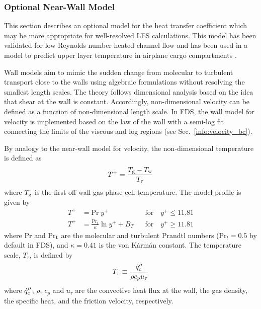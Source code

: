 \subsubsection{Optional Near-Wall Model}
\label{conflux_wall_model}

This section describes an optional model for the heat transfer coefficient which may be more appropriate for well-resolved LES calculations.  This model has been validated for low Reynolds number heated channel flow \cite{Park:2012} and has been used in a model to predict upper layer temperature in airplane cargo compartments \cite{Oztekin:FM2012}.

Wall models aim to mimic the sudden change from molecular to turbulent transport close to the walls using algebraic formulations without resolving the smallest length scales. The theory follows dimensional analysis based on the idea that shear at the wall is constant. Accordingly, non-dimensional velocity can be defined as a function of non-dimensional length scale. In FDS, the wall model for velocity is implemented based on the law of the wall with a semi-log fit connecting the limits of the viscous and log regions (see Sec.~\ref{info:velocity_bc}).

By analogy to the near-wall model for velocity, the non-dimensional temperature is defined as
\begin{equation}
T^+ = \frac{T_{\rm g} - T_{\rm w}}{T_\tau}
\end{equation}
where $T_{\rm g}$ is the first off-wall gas-phase cell temperature.  The model profile is given by
\begin{align}
\label{eqn_t_visclayer} T^+ &= \mbox{Pr}\;y^+                            && \mbox{for} \quad y^+ \le 11.81 \\
\label{eqn_t_loglaw}    T^+ &= \frac{\mbox{Pr}_t}{\kappa} \ln y^+ + B_T  && \mbox{for} \quad y^+ \ge 11.81
\end{align}
where Pr and Pr$_{\rm t}$ are the molecular and turbulent Prandtl numbers  (Pr$_t=0.5$ by default in FDS), and $\kappa = 0.41$ is the von K\'arm\'an constant.  The temperature scale, $T_{\tau}$, is defined by
\begin{equation}
\label{eqn_friction_temperature}
T_{\tau} \equiv \frac{\dot{q}_{\rm c}''}{{\rho}{c_p}{u_{\tau}}}
\end{equation}
where $\dot{q}_{\rm c}''$, $\rho$, $c_p$ and $u_{\tau}$  are the convective heat flux at the wall, the gas density, the specific heat, and the friction velocity, respectively.

